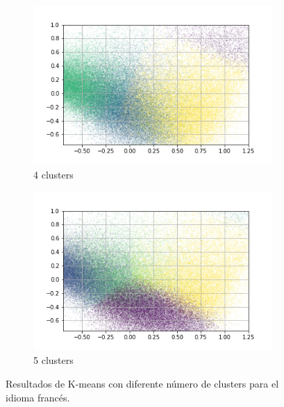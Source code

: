 \begin{figure}
\begin{subfigure}[b]{0.4\textwidth}
         \includegraphics[width=\textwidth]{results/TopicDetection/fr/PCA_4.png}
         \caption{4 clusters}
         \label{fig:fr_kmeans_4}
     \end{subfigure}
     \hfill
     \begin{subfigure}[b]{0.4\textwidth}
         \centering
         \includegraphics[width=\textwidth]{results/TopicDetection/fr/PCA_5.png}
         \caption{5 clusters}
         \label{fig:fr_kmeans_5}
     \end{subfigure}
        \caption{Resultados de K-means con diferente número de clusters para el idioma francés.}
        \label{fig:fr_kmeans}
\end{figure}



